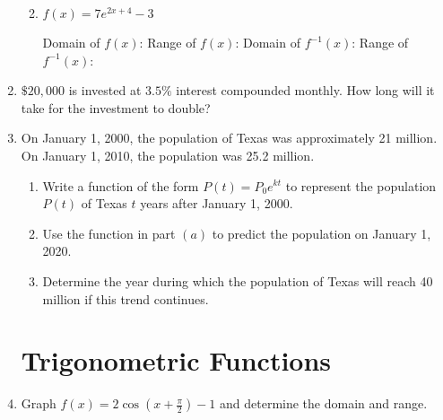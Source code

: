 \documentclass[11pt]{article}
\begin{document}
\begin{enumerate}
\begin{enumerate}
\vfill 
\item $f(x)=7e^{2x+4}-3$
\begin{flushright}
Domain of $f(x)$:  \quad \quad \quad\quad\quad\quad Range of $f(x)$:\quad\quad\quad\quad \vfill 
Domain of $f^{-1}(x)$:   \quad \quad\quad\quad\quad Range of $f^{-1}(x)$:\quad\quad\quad\quad
\end{flushright}
\end{enumerate}

\newpage

\item $\$20,000$ is invested at $3.5\%$ interest compounded monthly.  How long will it take for the investment to double?

\vfill

\item On January 1, 2000, the population of Texas was approximately 21 million.  On January 1, 2010, the population was 25.2 million.

\begin{enumerate}
\item Write a function of the form $P(t)=P_0e^{kt}$ to represent the population $P(t)$ of Texas $t$ years after January 1, 2000.
\vfill 
\item Use the function in part $(a)$ to predict the population on January 1, 2020.
\vfill
\item Determine the year during which the population of Texas will reach 40 million if this trend continues.
\vfill
\end{enumerate}
\newpage


\section{Trigonometric Functions}



\item Graph $\displaystyle f(x)=2\cos(x+\frac{\pi}{2})-1$ and determine the domain and range.

\end{enumerate}
\end{document}
